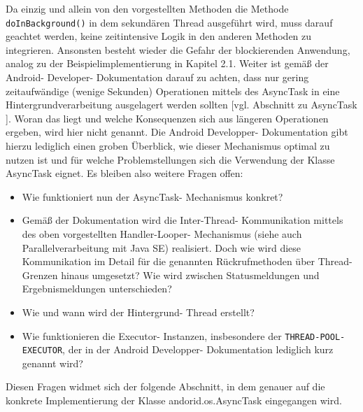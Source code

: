 \documentclass[12pt,oneside,a4paper,bibtotoc,liststotoc]{scrreprt}
\begin{document}
Da einzig und allein von den vorgestellten Methoden die Methode \texttt{doInBackground()} in dem sekundären Thread ausgeführt wird, muss darauf geachtet werden, keine zeitintensive Logik in den anderen Methoden zu integrieren. Ansonsten besteht wieder die Gefahr der blockierenden Anwendung, analog zu der Beispielimplementierung in Kapitel 2.1. Weiter ist gemäß der Android- Developer- Dokumentation darauf zu achten, dass nur gering zeitaufwändige (wenige Sekunden) Operationen mittels des AsyncTask in eine Hintergrundverarbeitung ausgelagert werden sollten [vgl. Abschnitt zu AsyncTask \citet{androidDevDocu}]. Woran das liegt und welche Konsequenzen sich aus längeren Operationen ergeben, wird hier nicht genannt. Die Android Developper- Dokumentation gibt hierzu lediglich einen groben Überblick, wie dieser Mechanismus optimal zu nutzen ist und für welche Problemstellungen sich die Verwendung der Klasse AsyncTask eignet. Es bleiben also weitere Fragen offen:
\begin{itemize}
\item Wie funktioniert nun der AsyncTask- Mechanismus konkret?
\item Gemäß der Dokumentation wird die Inter-Thread- Kommunikation mittels des oben vorgestellten Handler-Looper- Mechanismus (siehe auch Parallelverarbeitung mit Java SE) realisiert. Doch wie wird diese Kommunikation im Detail für die genannten Rückrufmethoden über Thread- Grenzen hinaus umgesetzt? Wie wird zwischen Statusmeldungen und Ergebnismeldungen unterschieden?
\item Wie und wann wird der Hintergrund- Thread erstellt?
\item Wie funktionieren die Executor- Instanzen, insbesondere der \texttt{THREAD-POOL-EXECUTOR}, der in der Android Developper- Dokumentation lediglich kurz genannt wird?
\end{itemize}
Diesen Fragen widmet sich der folgende Abschnitt, in dem genauer auf die konkrete Implementierung der Klasse andorid.os.AsyncTask eingegangen wird.
\end{document}
